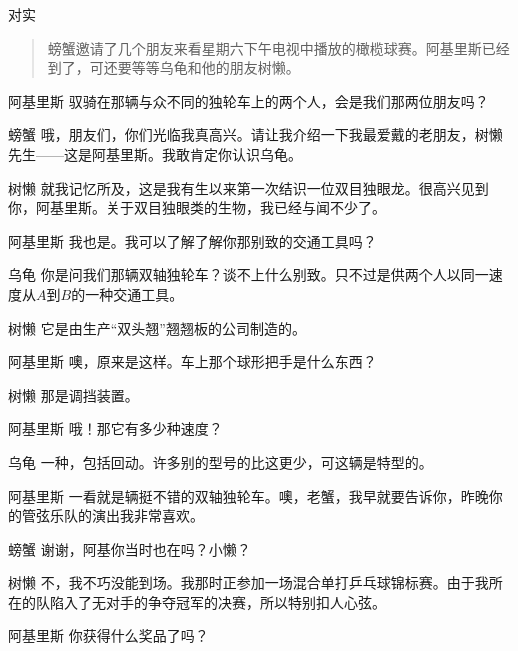
\begin{dialog}{对实}

\begin{quote}
螃蟹邀请了几个朋友来看星期六下午电视中播放的橄榄球赛。阿基里斯已经到了，可还要等等乌龟和他的朋友树懒。
\end{quote}

\begin{dialogue}

\item[阿基里斯]驭骑在那辆与众不同的独轮车上的两个人，会是我们那两位朋友吗？


\item[螃蟹]哦，朋友们，你们光临我真高兴。请让我介绍一下我最爱戴的老朋友，树懒先生——这是阿基里斯。我敢肯定你认识乌龟。

\item[树懒]就我记忆所及，这是我有生以来第一次结识一位双目独眼龙。很高兴见到你，阿基里斯。关于双目独眼类的生物，我已经与闻不少了。

\item[阿基里斯]我也是。我可以了解了解你那别致的交通工具吗？

\item[乌龟]你是问我们那辆双轴独轮车？谈不上什么别致。只不过是供两个人以同一速度从$A$到$B$的一种交通工具。

\item[树懒]它是由生产“双头翘”翘翘板的公司制造的。

\item[阿基里斯]噢，原来是这样。车上那个球形把手是什么东西？

\item[树懒]那是调挡装置。

\item[阿基里斯]哦！那它有多少种速度？

\item[乌龟]一种，包括回动。许多别的型号的比这更少，可这辆是特型的。

\item[阿基里斯]一看就是辆挺不错的双轴独轮车。噢，老蟹，我早就要告诉你，昨晚你的管弦乐队的演出我非常喜欢。

\item[螃蟹]谢谢，阿基你当时也在吗？小懒？

\item[树懒]不，我不巧没能到场。我那时正参加一场混合单打乒乓球锦标赛。由于我所在的队陷入了无对手的争夺冠军的决赛，所以特别扣人心弦。

\item[阿基里斯]你获得什么奖品了吗？


\end{dialogue}
\end{dialog}
